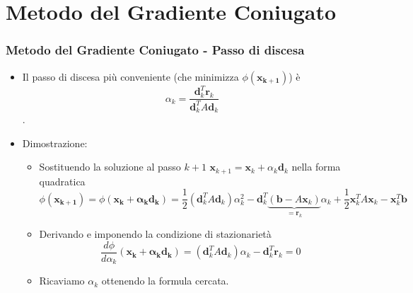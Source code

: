 \documentclass[10pt]{beamer}
\begin{document}
\section{Metodo del Gradiente Coniugato}\label{sec:sec2}
\begin{frame} \frametitle{Metodo del Gradiente Coniugato - Passo di discesa}
\begin{itemize}

\item Il \alert{passo di discesa} più conveniente (che minimizza $\phi(\mathbf{x_{k+1}})$) è
$$\alpha_k=\frac{\mathbf{d}_k^T \mathbf{r}_k}{\mathbf{d}_k^T A \mathbf{d}_k}$$ .

\item Dimostrazione:
\begin{itemize}
    \item Sostituendo la soluzione al passo $k+1$ $\mathbf{x}_{k+1}=\mathbf{x}_{k}+\alpha_k\mathbf{d}_{k}$ nella forma quadratica
    $$\phi(\mathbf{x_{k+1}})=\phi(\mathbf{\mathbf{x}_{k}+\alpha_k\mathbf{d}_{k}})=
    \frac{1}{2}\left(\mathbf{d}_k^TA\mathbf{d}_k\right)\alpha_k^2
    -\mathbf{d}_k^T\underbrace{\left(\mathbf{b}-A\mathbf{x}_k\right)}_{=\mathbf{r}_k}\alpha_k
    +\frac{1}{2}\mathbf{x}_k^TA\mathbf{x}_k
    -\mathbf{x}_k^T\mathbf{b}
    $$
    
    \item Derivando e imponendo la condizione di stazionarietà
    $$
    \frac{d\phi}{d\alpha_k}(\mathbf{\mathbf{x}_{k}+\alpha_k\mathbf{d}_{k}})=
    \left(\mathbf{d}_k^TA\mathbf{d}_k\right)\alpha_k
    -\mathbf{d}_k^T\mathbf{r}_k=0
    $$
    \item Ricaviamo $\alpha_k$ ottenendo la formula cercata.
    
    \end{itemize}

\end{itemize}
\end{frame}
\end{document}
